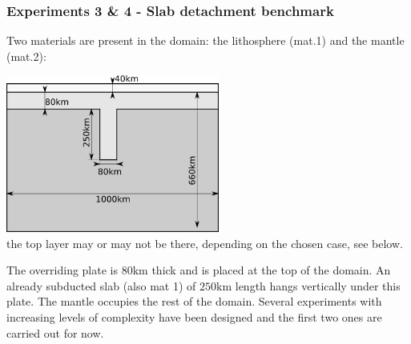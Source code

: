 \subsubsection*{Experiments 3 \& 4 - Slab detachment benchmark}

Two materials are present in the domain: the lithosphere (mat.1) and the mantle (mat.2):

\begin{center}
\includegraphics[width=7cm]{python_codes/fieldstone_87/images/drawing.png}\\
{\captionfont the top layer may or may not be there, depending on the chosen case, see below.}
\end{center}

The overriding plate is $80\si{\kilo\metre}$ thick and is placed at the top of the domain. 
An already subducted slab (also mat 1) of $250\si{\kilo\metre}$ length hangs vertically under this plate.
The mantle occupies the rest of the domain.
Several experiments with increasing levels of complexity have been designed 
and the first two ones are carried out for now.

